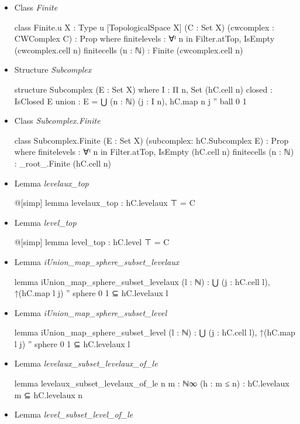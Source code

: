 \documentclass[colorinlistoftodos]{article}
\newcommand{\question}[1]{\todo[color=green!40]{#1}}
\begin{document}
\begin{itemize}
  \item Class \emph{Finite} \question{Should this be a class?}
\begin{leancode}
class Finite.{u} {X : Type u} [TopologicalSpace X] (C : Set X) (cwcomplex : CWComplex C) :
Prop where
  finitelevels : ∀ᶠ n in Filter.atTop, IsEmpty (cwcomplex.cell n)
  finitecells (n : ℕ) : Finite (cwcomplex.cell n)
\end{leancode}
  \item Structure \emph{Subcomplex}
\begin{leancode}
structure Subcomplex (E : Set X) where
  I : Π n, Set (hC.cell n)
  closed : IsClosed E
  union : E = ⋃ (n : ℕ) (j : I n), hC.map n j '' ball 0 1
\end{leancode}
  \item Class \emph{Subcomplex.Finite}
\begin{leancode}
class Subcomplex.Finite (E : Set X) (subcomplex: hC.Subcomplex E) : Prop where
  finitelevels : ∀ᶠ n in Filter.atTop, IsEmpty (hC.cell n)
  finitecells (n : ℕ) : _root_.Finite (hC.cell n)
\end{leancode}
  \item Lemma \emph{levelaux\_top}
\begin{leancode}
@[simp] lemma levelaux_top : hC.levelaux ⊤ = C
\end{leancode}
  \item Lemma \emph{level\_top}
\begin{leancode}
@[simp] lemma level_top : hC.level ⊤ = C
\end{leancode}
  \item Lemma \emph{iUnion\_map\_sphere\_subset\_levelaux}
\begin{leancode}
lemma iUnion_map_sphere_subset_levelaux (l : ℕ) : 
  ⋃ (j : hC.cell l), ↑(hC.map l j) '' sphere 0 1 ⊆ hC.levelaux l
\end{leancode}
  \item Lemma \emph{iUnion\_map\_sphere\_subset\_level}
\begin{leancode}
lemma iUnion_map_sphere_subset_level (l : ℕ) :
  ⋃ (j : hC.cell l), ↑(hC.map l j) '' sphere 0 1 ⊆ hC.levelaux l
\end{leancode}
  \item Lemma \emph{levelaux\_subset\_levelaux\_of\_le}
\begin{leancode}
lemma levelaux_subset_levelaux_of_le {n m : ℕ∞} (h : m ≤ n) :
  hC.levelaux m ⊆ hC.levelaux n
\end{leancode}
  \item Lemma \emph{level\_subset\_level\_of\_le}

\end{itemize}
\end{document}
